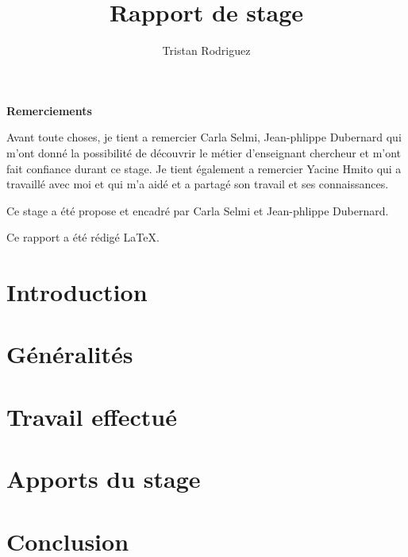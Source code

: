 \documentclass{univ-projet}
\author{Tristan Rodriguez}
\title{Rapport de stage}
\begin{document}
  \maketitle
    \begin{center}
      \textbf{Remerciements}

      Avant toute choses, je tient a remercier Carla Selmi, Jean-phlippe Dubernard qui m'ont donné la possibilité de découvrir le métier d'enseignant chercheur et m'ont fait confiance durant ce stage. Je tient également a remercier Yacine Hmito qui a travaillé avec moi et qui m'a aidé et a partagé son travail et ses connaissances.

      Ce stage a  été propose et encadré par Carla Selmi et Jean-phlippe Dubernard.

      Ce rapport a été rédigé \LaTeX.
    \end{center}

  \clearpage
  
  \tableofcontents
  \clearpage


  \section{Introduction}
  \label{sec:Introduction}
  
  
  \section{Généralités}
  \label{sec:généralités}
  
    
  \section{Travail effectué}
  \label{sec:Travail effectué}
  

  \section{Apports du stage}
  \label{Apports du stage}
  
  
  \section{Conclusion}
  \label{sec:conclusion}
  
  
\end{document}
